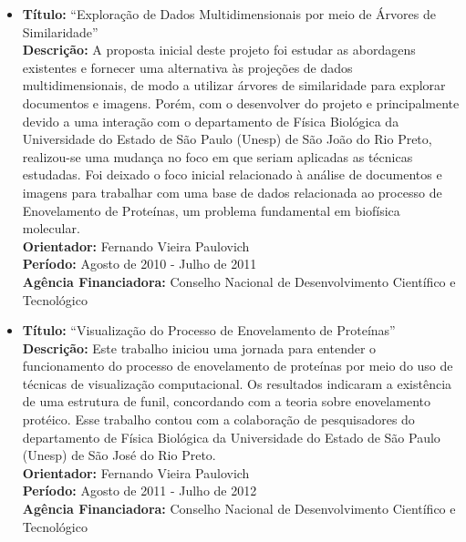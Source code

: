 \documentclass[12pt]{article}
\begin{document}
\begin{itemize} 

    \item \textbf{Título:} ``Exploração de Dados Multidimensionais por
        meio de Árvores de Similaridade''\\ 
        \textbf{Descrição:} A proposta inicial deste
        projeto foi estudar as abordagens existentes e
        fornecer uma alternativa às projeções de dados
        multidimensionais, de modo a utilizar árvores de
        similaridade para explorar documentos e imagens.
        Porém, com o desenvolver do projeto e principalmente
        devido a uma interação com o departamento de Física
        Biológica da Universidade do Estado de São Paulo
        (Unesp) de São João do Rio Preto, realizou-se uma
        mudança no foco em que seriam aplicadas as técnicas
        estudadas. Foi deixado o foco inicial relacionado à
        análise de documentos e imagens para trabalhar com
        uma base de dados relacionada ao processo de
        Enovelamento de Proteínas, um problema fundamental
        em biofísica molecular.\\
        \textbf{Orientador:} Fernando Vieira Paulovich\\ 
        \textbf{Período:} Agosto de 2010 - Julho de 2011\\ 
        \textbf{Agência Financiadora:} Conselho
        Nacional de Desenvolvimento Científico e
        Tecnológico\\ 

 \item \textbf{Título:} ``Visualização do Processo de Enovelamento
        de Proteínas''\\ 
        \textbf{Descrição:} Este trabalho
        iniciou uma jornada para entender o funcionamento do
        processo de enovelamento de proteínas por meio do
        uso de técnicas de visualização computacional. Os
        resultados indicaram a existência de uma estrutura
        de funil, concordando com a teoria sobre
        enovelamento protéico. Esse trabalho contou com a
        colaboração de pesquisadores do departamento de
        Física Biológica da Universidade do Estado de São
        Paulo (Unesp) de São José do Rio Preto. \\
        \textbf{Orientador:} Fernando Vieira Paulovich\\ 
        \textbf{Período:} Agosto de 2011 - Julho de 2012\\ 
        \textbf{Agência Financiadora:} Conselho
        Nacional de Desenvolvimento Científico e
        Tecnológico\\ 


\end{itemize}
\end{document}
